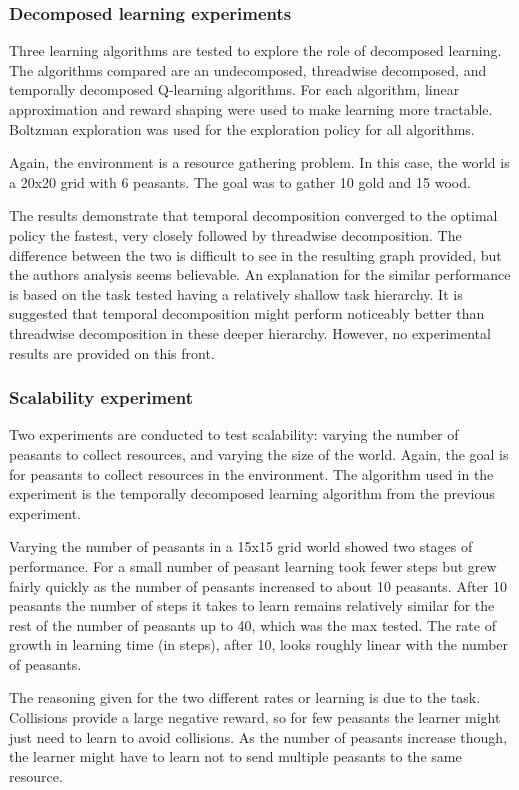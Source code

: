\documentclass[jair,twoside,11pt,theapa]{article}
\begin{document}
\subsubsection{Decomposed learning experiments}
Three learning algorithms are tested to explore the role of decomposed learning. The algorithms compared are an undecomposed, threadwise decomposed, and temporally decomposed Q-learning algorithms. For each algorithm, linear approximation and reward shaping were used to make learning more tractable. Boltzman exploration was used for the exploration policy for all algorithms. 

Again, the environment is a resource gathering problem. In this case, the world is a 20x20 grid with 6 peasants. The goal was to gather 10 gold and 15 wood.

The results demonstrate that temporal decomposition converged to the optimal policy the fastest, very closely followed by threadwise decomposition. The difference between the two is difficult to see in the resulting graph provided, but the authors analysis seems believable. An explanation for the similar performance is based on the task tested having a relatively shallow task hierarchy. It is suggested that temporal decomposition might perform noticeably better than threadwise decomposition in these deeper hierarchy. However, no experimental results are provided on this front. 

\subsubsection{Scalability experiment}
Two experiments are conducted to test scalability: varying the number of peasants to collect resources, and varying the size of the world. Again, the goal is for peasants to collect resources in the environment. The algorithm used in the experiment is the temporally decomposed learning algorithm from the previous experiment.

Varying the number of peasants in a 15x15 grid world showed two stages of performance. For a small number of peasant learning took fewer steps but grew fairly quickly as the number of peasants increased to about 10 peasants. After 10 peasants the number of steps it takes to learn remains relatively similar for the rest of the number of peasants up to 40, which was the max tested. The rate of growth in learning time (in steps), after 10, looks roughly linear with the number of peasants. 

The reasoning given for the two different rates or learning is due to the task. Collisions provide a large negative reward, so for few peasants the learner might just need to learn to avoid collisions. As the number of peasants increase though, the learner might have to learn not to send multiple peasants to the same resource. 
\end{document}
